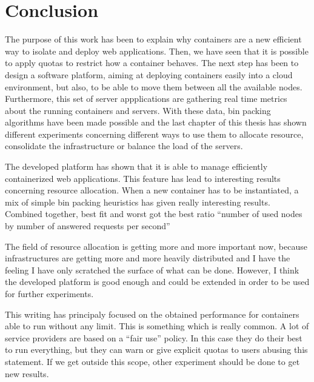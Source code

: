 \chapter*{Conclusion}

The purpose of this work has been to explain why containers are a new efficient
way to isolate and deploy web applications. Then, we have seen that it is
possible to apply quotas to restrict how a container behaves. The next
step has been to design a software platform, aiming at deploying containers
easily into a cloud environment, but also, to be able to move them between all
the available nodes. Furthermore, this set of server appplications are gathering
real time metrics about the running containers and servers. With these data,
bin packing algorithms have been made possible and the last chapter of this
thesis has shown different experiments concerning different ways to use them
to allocate resource, consolidate the infrastructure or balance the load of the
servers.
\vspace{1em}

The developed platform has shown that it is able to manage efficiently
containerized web applications. This feature has lead to interesting results
concerning resource allocation. When a new container has to be instantiated, a
mix of simple bin packing heuristics has given really interesting results.
Combined together, best fit and worst got the best ratio ``number of used nodes
by number of answered requests per second''
\vspace{1em}

The field of resource allocation is getting more and more important now,
because infrastructures are getting more and more heavily distributed and I
have the feeling I have only scratched the surface of what can be done.
However, I think the developed platform is good enough and could be extended
in order to be used for further experiments.
\vspace{1em}

This writing has principaly focused on the obtained performance for containers
able to run without any limit. This is something which is really common. A lot
of service providers are based on a ``fair use'' policy. In this case they do
their best to run everything, but they can warn or give explicit quotas to users
abusing this statement. If we get outside this scope, other experiment should
be done to get new results.
\vspace{1em}

